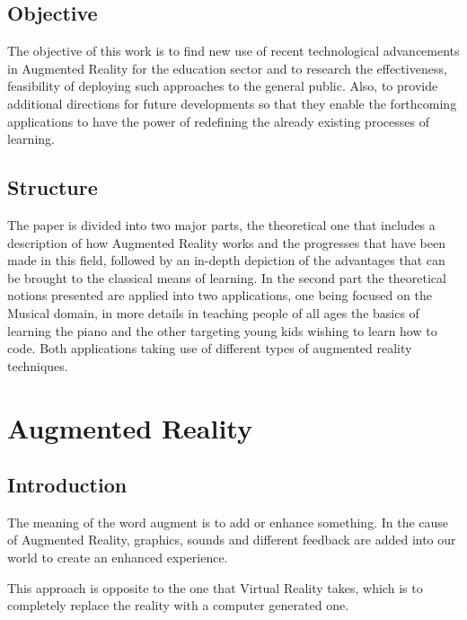 \documentclass[12 pct]{report}
\begin{document}
\section{Objective}
The objective of this work is to find new use of recent technological advancements in Augmented Reality for the education sector and to research the effectiveness, feasibility of deploying such approaches to the general public. Also, to provide additional directions for future developments so that they enable the  forthcoming applications to have the power of redefining the already existing processes of learning.

\section{Structure}
The paper is divided into two major parts, the theoretical one that includes a description of how Augmented Reality works and the progresses that have been made in this field, followed by an in-depth depiction of the advantages that can be brought to the classical means of learning. In the second part the theoretical notions presented are applied into two applications, one being focused on the Musical domain, in more details in teaching people of all ages the basics of learning the piano and the other targeting young kids wishing to learn how to code. Both applications taking use of different types of augmented reality techniques.
\chapter{Augmented Reality}

\section{Introduction}
The meaning of the word augment is to add or enhance something. In the cause of Augmented Reality, graphics, sounds and different feedback are added into our world to create an enhanced experience.

This approach is opposite to the one that Virtual Reality takes, which is to completely replace the reality with a computer generated one.
\end{document}
